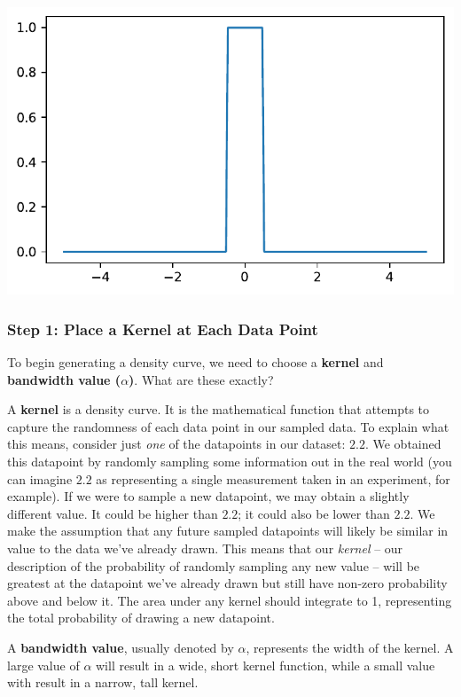 \documentclass[
  letterpaper,
  DIV=11,
  numbers=noendperiod]{scrreprt}
\begin{document}
\includegraphics{visualization_2/visualization_2_files/figure-pdf/cell-6-output-1.pdf}

\subsubsection{Step 1: Place a Kernel at Each Data
Point}\label{step-1-place-a-kernel-at-each-data-point}

To begin generating a density curve, we need to choose a \textbf{kernel}
and \textbf{bandwidth value (\(\alpha\))}. What are these exactly?

A \textbf{kernel} is a density curve. It is the mathematical function
that attempts to capture the randomness of each data point in our
sampled data. To explain what this means, consider just \emph{one} of
the datapoints in our dataset: \(2.2\). We obtained this datapoint by
randomly sampling some information out in the real world (you can
imagine \(2.2\) as representing a single measurement taken in an
experiment, for example). If we were to sample a new datapoint, we may
obtain a slightly different value. It could be higher than \(2.2\); it
could also be lower than \(2.2\). We make the assumption that any future
sampled datapoints will likely be similar in value to the data we've
already drawn. This means that our \emph{kernel} -- our description of
the probability of randomly sampling any new value -- will be greatest
at the datapoint we've already drawn but still have non-zero probability
above and below it. The area under any kernel should integrate to 1,
representing the total probability of drawing a new datapoint.

A \textbf{bandwidth value}, usually denoted by \(\alpha\), represents
the width of the kernel. A large value of \(\alpha\) will result in a
wide, short kernel function, while a small value with result in a
narrow, tall kernel.
\end{document}

